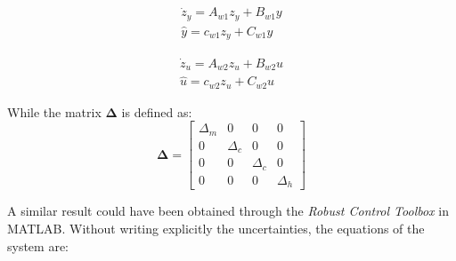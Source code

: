 \documentclass{scrreprt}
\begin{document}
\begin{equation}
    \begin{aligned}
        \dot{z}_y = A_{w1} z_y + B_{w1} y\\
        \hat{y} = c_{w1} z_y + C_{w1} y
    \end{aligned}
\end{equation}

\begin{equation}
    \begin{aligned}
        \dot{z}_u = A_{w2} z_u + B_{w2} u\\
        \hat{u} = c_{w2} z_u + C_{w2} u
    \end{aligned}
\end{equation}

While the matrix $\boldsymbol{\Delta}$ is defined as:
\begin{equation}
    \boldsymbol{\Delta}=\begin{bmatrix}
        \Delta_m & 0 & 0 & 0\\
        0 & \Delta_c & 0 & 0\\
        0 & 0 & \Delta_c & 0\\
        0 & 0 & 0 & \Delta_h
    \end{bmatrix}
\end{equation}

A similar result could have been obtained through the \textit{Robust Control Toolbox} in MATLAB. Without writing explicitly the uncertainties, the equations of the system are:
\end{document}
